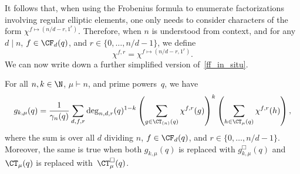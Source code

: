 It follows that, when using the Frobenius formula to enumerate factorizations involving regular elliptic elements, one only needs to consider characters of the form \(\chi^{f \mapsto (n/d-r,1^r)}\).
Therefore, when \(n\) is understood from context, and for any \(d \mid n\), \(f \in \CF_d (q)\), and \(r \in \{0,\ldots,n/d-1\}\), we define
\begin{equation}
\chi^{f,r} = \chi^{f \mapsto (n/d-r,1^r)}.
\end{equation}
We can now write down a further simplified version of~\eqref{ff_in_situ}.
\begin{corollary}
\label{simpler_ff_in_situ_corollary}
For all \(n,k \in \N\), \(\mu \vdash n\), and prime powers~\(q\), we have
\begin{equation}
\label{simpler_ff_in_situ}
g_{k,\mu} (q)
=
\frac{1}{\gamma_n(q)}
\sum_{d,f,r}
\deg_{n,d,r}(q)^{1-k}
\left ( \sum_{g \in \CT_{(n)} (q)} \chi^{f,r}(g) \right )^k
\left ( \sum_{h \in \CT_\mu (q)}   \chi^{f,r}(h) \right ),
\end{equation}
where the sum is over all \(d\) dividing \(n\), \(f \in \CF_d (q)\), and \(r \in \{0,\ldots,n/d-1\}\).
Moreover, the same is true when both \(g_{k,\mu} (q)\) is replaced with \(g_{k,\mu}^\Box (q)\) and \(\CT_\mu (q)\) is replaced with~\(\CT_\mu^\Box (q)\).
\end{corollary}















































